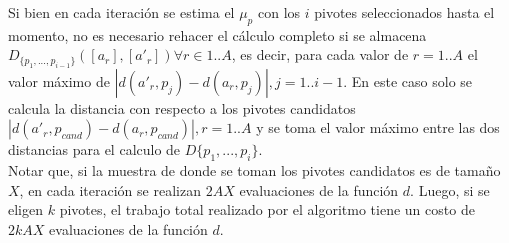 Si bien en cada iteraci\'on se estima el $\mu_p$ con los $i$ pivotes seleccionados hasta el momento, no es necesario rehacer el c\'alculo completo si se almacena $D_{\{p_1,...,p_{i-1}\}}([a_r],[a'_r]) \forall r \in 1..A$, es decir, para cada valor de $r=1..A$ el valor m\'aximo de $|d(a'_r, p_j) - d(a_r, p_j)|, j = 1..i-1$. En este caso solo se calcula la distancia con respecto a los pivotes candidatos $|d(a'_r, p_{cand}) - d(a_r, p_{cand})|, r = 1..A$ y se toma el valor m\'aximo entre las dos distancias para el calculo de $D\{p_1, ...,p_i\}$.\\

Notar que, si la muestra de donde se toman los pivotes candidatos es de tama\~no $X$, en cada iteraci\'on se realizan $2AX$ evaluaciones de la funci\'on $d$. Luego, si se eligen $k$ pivotes, el trabajo total realizado por el algoritmo tiene un costo de $2kAX$ evaluaciones de la funci\'on $d$.\\